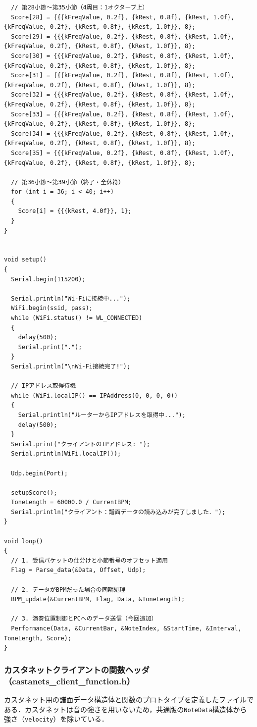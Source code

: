 \begin{lstlisting}
  // 第28小節〜第35小節（4周目：1オクターブ上）
  Score[28] = {{{kFreqValue, 0.2f}, {kRest, 0.8f}, {kRest, 1.0f}, {kFreqValue, 0.2f}, {kRest, 0.8f}, {kRest, 1.0f}}, 8};
  Score[29] = {{{kFreqValue, 0.2f}, {kRest, 0.8f}, {kRest, 1.0f}, {kFreqValue, 0.2f}, {kRest, 0.8f}, {kRest, 1.0f}}, 8};
  Score[30] = {{{kFreqValue, 0.2f}, {kRest, 0.8f}, {kRest, 1.0f}, {kFreqValue, 0.2f}, {kRest, 0.8f}, {kRest, 1.0f}}, 8};
  Score[31] = {{{kFreqValue, 0.2f}, {kRest, 0.8f}, {kRest, 1.0f}, {kFreqValue, 0.2f}, {kRest, 0.8f}, {kRest, 1.0f}}, 8};
  Score[32] = {{{kFreqValue, 0.2f}, {kRest, 0.8f}, {kRest, 1.0f}, {kFreqValue, 0.2f}, {kRest, 0.8f}, {kRest, 1.0f}}, 8};
  Score[33] = {{{kFreqValue, 0.2f}, {kRest, 0.8f}, {kRest, 1.0f}, {kFreqValue, 0.2f}, {kRest, 0.8f}, {kRest, 1.0f}}, 8};
  Score[34] = {{{kFreqValue, 0.2f}, {kRest, 0.8f}, {kRest, 1.0f}, {kFreqValue, 0.2f}, {kRest, 0.8f}, {kRest, 1.0f}}, 8};
  Score[35] = {{{kFreqValue, 0.2f}, {kRest, 0.8f}, {kRest, 1.0f}, {kFreqValue, 0.2f}, {kRest, 0.8f}, {kRest, 1.0f}}, 8};

  // 第36小節〜第39小節（終了・全休符）
  for (int i = 36; i < 40; i++)
  {
    Score[i] = {{{kRest, 4.0f}}, 1};
  }
}


void setup()
{
  Serial.begin(115200);

  Serial.println("Wi-Fiに接続中...");
  WiFi.begin(ssid, pass);
  while (WiFi.status() != WL_CONNECTED)
  {
    delay(500);
    Serial.print(".");
  }
  Serial.println("\nWi-Fi接続完了!");

  // IPアドレス取得待機
  while (WiFi.localIP() == IPAddress(0, 0, 0, 0))
  {
    Serial.println("ルーターからIPアドレスを取得中...");
    delay(500);
  }
  Serial.print("クライアントのIPアドレス: ");
  Serial.println(WiFi.localIP());

  Udp.begin(Port);

  setupScore();
  ToneLength = 60000.0 / CurrentBPM;
  Serial.println("クライアント：譜面データの読み込みが完了しました．");
}

void loop()
{
  // 1. 受信パケットの仕分けと小節番号のオフセット適用
  Flag = Parse_data(&Data, Offset, Udp);

  // 2. データがBPMだった場合の同期処理
  BPM_update(&CurrentBPM, Flag, Data, &ToneLength);

  // 3. 演奏位置制御とPCへのデータ送信（今回追加）
  Performance(Data, &CurrentBar, &NoteIndex, &StartTime, &Interval, ToneLength, Score);
}
\end{lstlisting}

\subsubsection{カスタネットクライアントの関数ヘッダ（castanets\_client\_function.h）}
カスタネット用の譜面データ構造体と関数のプロトタイプを定義したファイルである．カスタネットは音の強さを用いないため，共通版の\texttt{NoteData}構造体から強さ（\texttt{velocity}）を除いている．

